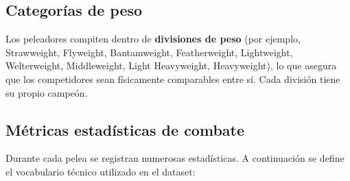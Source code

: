 \documentclass[11pt,a4paper]{article}
\begin{document}
\subsection*{Categorías de peso}

Los peleadores compiten dentro de \textbf{divisiones de peso} (por ejemplo, Strawweight, Flyweight, Bantamweight, Featherweight, Lightweight, Welterweight, Middleweight, Light Heavyweight, Heavyweight), lo que asegura que los competidores sean físicamente comparables entre sí. Cada división tiene su propio campeón.

\subsection*{Métricas estadísticas de combate}

Durante cada pelea se registran numerosas estadísticas. A continuación se define el vocabulario técnico utilizado en el dataset:
\end{document}
